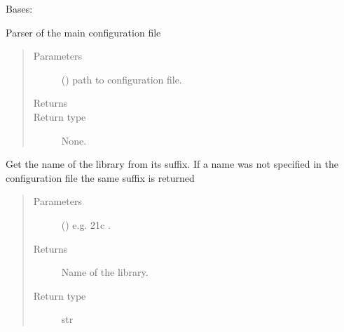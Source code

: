 \documentclass[letterpaper,10pt,english]{sphinxmanual}
\begin{document}
\begin{fulllineitems}
\label{\detokenize{api/initobjects:configuration.Configuration}}
\sphinxAtStartPar
Bases: 

\sphinxAtStartPar
Parser of the main configuration file
\begin{quote}\begin{description}
\item[{Parameters}] \leavevmode
\sphinxAtStartPar
{} () \textendash{} path to configuration file.

\item[{Returns}] \leavevmode
\sphinxAtStartPar


\item[{Return type}] \leavevmode
\sphinxAtStartPar
None.

\end{description}\end{quote}

\begin{fulllineitems}
\label{\detokenize{api/initobjects:configuration.Configuration.get_lib_name}}
\sphinxAtStartPar
Get the name of the library from its suffix. If a name was not
specified in the configuration file the same suffix is returned
\begin{quote}\begin{description}
\item[{Parameters}] \leavevmode
\sphinxAtStartPar
{} () \textendash{} e.g. 21c .

\item[{Returns}] \leavevmode
\sphinxAtStartPar
Name of the library.

\item[{Return type}] \leavevmode
\sphinxAtStartPar
str

\end{description}\end{quote}


\end{fulllineitems}
\end{fulllineitems}
\end{document}
